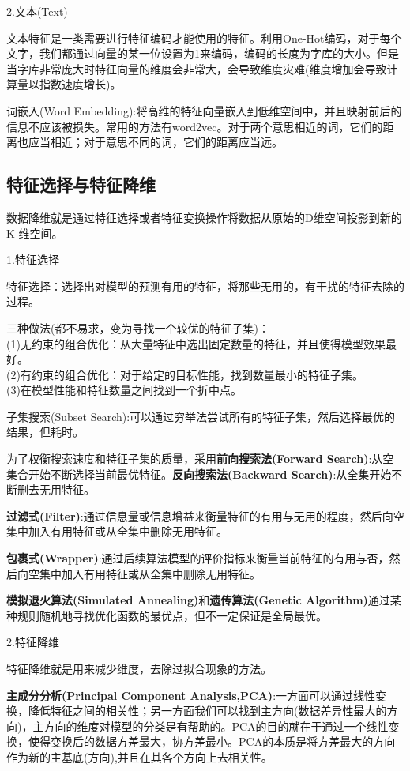 \documentclass[openbib]{article}
\begin{document}
\begin{center}
	2.文本(Text)
\end{center}
文本特征是一类需要进行特征编码才能使用的特征。利用One-Hot编码，对于每个文字，我们都通过向量的某一位设置为1来编码，编码的长度为字库的大小。但是当字库非常庞大时特征向量的维度会非常大，会导致维度灾难(维度增加会导致计算量以指数速度增长)。

词嵌入(Word Embedding):将高维的特征向量嵌入到低维空间中，并且映射前后的信息不应该被损失。常用的方法有word2vec。对于两个意思相近的词，它们的距离也应当相近；对于意思不同的词，它们的距离应当远。
\subsection{特征选择与特征降维}
数据降维就是通过特征选择或者特征变换操作将数据从原始的D维空间投影到新的 K 维空间。
\begin{center}
	1.特征选择
\end{center}
特征选择：选择出对模型的预测有用的特征，将那些无用的，有干扰的特征去除的过程。

三种做法(都不易求，变为寻找一个较优的特征子集)：
\\(1)无约束的组合优化：从大量特征中选出固定数量的特征，并且使得模型效果最好。
\\(2)有约束的组合优化：对于给定的目标性能，找到数量最小的特征子集。
\\(3)在模型性能和特征数量之间找到一个折中点。

子集搜索(Subset Search):可以通过穷举法尝试所有的特征子集，然后选择最优的结果，但耗时。

为了权衡搜索速度和特征子集的质量，采用\textbf{前向搜索法(Forward Search)}:从空集合开始不断选择当前最优特征。\textbf{反向搜索法(Backward Search)}:从全集开始不断删去无用特征。

\textbf{过滤式(Filter)}:通过信息量或信息增益来衡量特征的有用与无用的程度，然后向空集中加入有用特征或从全集中删除无用特征。

\textbf{包裹式(Wrapper)}:通过后续算法模型的评价指标来衡量当前特征的有用与否，然后向空集中加入有用特征或从全集中删除无用特征。

\textbf{模拟退火算法(Simulated Annealing)}和\textbf{遗传算法(Genetic Algorithm)}通过某种规则随机地寻找优化函数的最优点，但不一定保证是全局最优。
\begin{center}
	2.特征降维
\end{center}

特征降维就是用来减少维度，去除过拟合现象的方法。

\textbf{主成分分析(Principal Component Analysis,PCA)}:一方面可以通过线性变换，降低特征之间的相关性；另一方面我们可以找到主方向(数据差异性最大的方向)，主方向的维度对模型的分类是有帮助的。PCA的目的就在于通过一个线性变换，使得变换后的数据方差最大，协方差最小。PCA的本质是将方差最大的方向作为新的主基底(方向),并且在其各个方向上去相关性。
\end{document}
